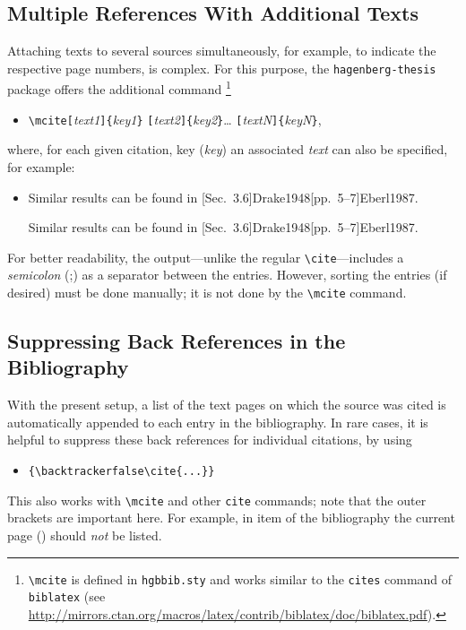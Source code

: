 \subsection{Multiple References With Additional Texts}

Attaching texts to several sources simultaneously, for example, to indicate the
respective page numbers, is complex. For this purpose, the
\texttt{hagenberg-thesis} package offers the additional command%
\footnote{\texttt{\textbackslash mcite} is defined in \texttt{hgbbib.sty} and
works similar to the \texttt{{\bs}cites} command of \texttt{biblatex}
(see \url{http://mirrors.ctan.org/macros/latex/contrib/biblatex/doc/biblatex.pdf}).}
%
\begin{itemize}
\item[]
\verb!\mcite[!\textit{text1}\verb!]{!\textit{key1}\verb!}!%
      \verb![!\textit{text2}\verb!]{!\textit{key2}\verb!}!\ldots%
			\verb![!\textit{textN}\verb!]{!\textit{keyN}\verb!}!,
\end{itemize}
%
where, for each given citation, key (\textit{key}) an associated \textit{text} can
also be specified, for example:
%
\begin{itemize}
    \item Similar results can be found in 
    [Sec.~3.6]{Drake1948}[pp.~5--7]{Eberl1987}.
\begin{LaTeXCode}[numbers=none]
Similar results can be found in 
[Sec.~3.6]{Drake1948}[pp.~5--7]{Eberl1987}.
\end{LaTeXCode}
\end{itemize}
%
For better readability, the output---unlike the regular
\texttt{\textbackslash cite}---includes a \emph{semicolon} (;) as a separator
between the entries. However, sorting the entries (if desired) must be done
manually; it is not done by the \texttt{\textbackslash mcite} command.


\subsection{Suppressing Back References in the Bibliography}

With the present setup, a list of the text pages on which the source was cited
is automatically appended to each entry in the bibliography. In rare cases, it
is helpful to suppress these back references for individual citations, by using
%
\begin{itemize}
    \item[] \verb!{\backtrackerfalse\cite{...}}!
\end{itemize}
%
This also works with \verb!\mcite! and other \verb!cite! commands; note that 
the outer brackets are important here. For example, in item
{\backtrackerfalse\parencite{Bezos2025}} of the bibliography 
the current page (\the\value{page}) should \emph{not} be listed.

